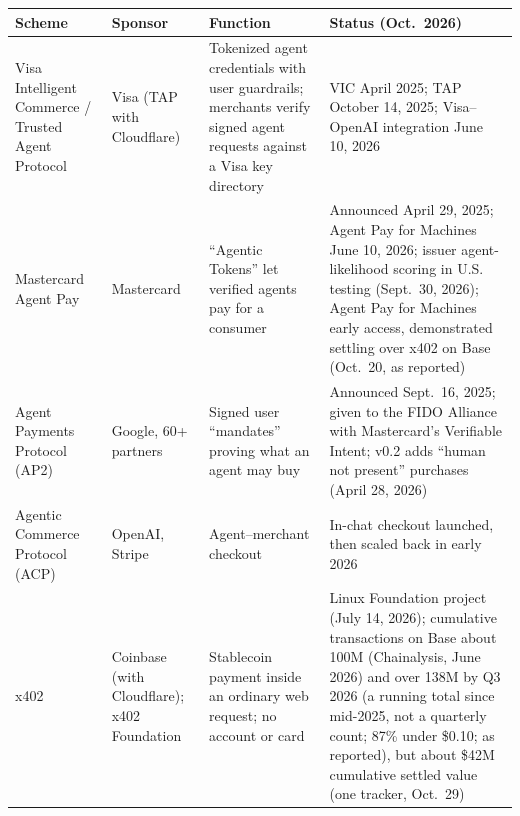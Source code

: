 \documentclass[11pt,letterpaper]{article}
\renewcommand{\arraystretch}{1.4}
\begin{document}
\begingroup\small{}\renewcommand{\arraystretch}{1.25}
\begin{longtable}{L{0.19\dimexpr{}\tabcolsep\relax}L{0.15\dimexpr{}\tabcolsep\relax}L{0.31\dimexpr{}\tabcolsep\relax}L{0.35\dimexpr{}\tabcolsep\relax}}
\toprule
\textbf{Scheme} & \textbf{Sponsor} & \textbf{Function} & \textbf{Status (Oct.\ 2026)} \\
\midrule
\endhead
Visa Intelligent Commerce / Trusted Agent Protocol & Visa (TAP with Cloudflare) & Tokenized agent credentials with user guardrails; merchants verify signed agent requests against a Visa key directory & VIC April 2025; TAP October 14, 2025; Visa--OpenAI integration June 10, 2026 \\
Mastercard Agent Pay & Mastercard & ``Agentic Tokens'' let verified agents pay for a consumer & Announced April 29, 2025; Agent Pay for Machines June 10, 2026; issuer agent-likelihood scoring in U.S. testing (Sept.\ 30, 2026); Agent Pay for Machines early access, demonstrated settling over x402 on Base (Oct.\ 20, as reported) \\
Agent Payments Protocol (AP2) & Google, 60+ partners & Signed user ``mandates'' proving what an agent may buy & Announced Sept.\ 16, 2025; given to the FIDO Alliance with Mastercard's Verifiable Intent; v0.2 adds ``human not present'' purchases (April 28, 2026) \\
Agentic Commerce Protocol (ACP) & OpenAI, Stripe & Agent--merchant checkout & In-chat checkout launched, then scaled back in early 2026 \\
x402 & Coinbase (with Cloudflare); x402 Foundation & Stablecoin payment inside an ordinary web request; no account or card & Linux Foundation project (July 14, 2026); cumulative transactions on Base about 100M (Chainalysis, June 2026) and over 138M by Q3 2026 (a running total since mid-2025, not a quarterly count; 87\% under \$0.10; as reported), but about \$42M cumulative settled value (one tracker, Oct.\ 29) \\
\bottomrule
\end{longtable}
\endgroup
\end{document}
